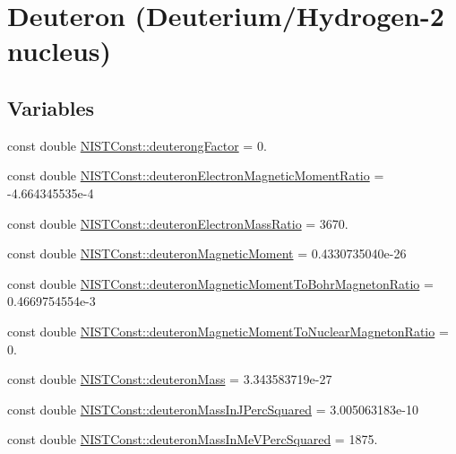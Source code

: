 \hypertarget{group___n_i_s_t_const-_deuteron}{}\section{Deuteron (Deuterium/\+Hydrogen-\/2 nucleus)}
\label{group___n_i_s_t_const-_deuteron}
\subsection*{Variables}
\begin{DoxyCompactItemize}
\item 
const double \hyperlink{group___n_i_s_t_const-_deuteron_ga975b6e46b7ceaa0780c4b066a52444b7}{N\+I\+S\+T\+Const\+::deuterong\+Factor} = 0.
\item 
const double \hyperlink{group___n_i_s_t_const-_deuteron_gaa01fffefa3ab64430fabf08808572689}{N\+I\+S\+T\+Const\+::deuteron\+Electron\+Magnetic\+Moment\+Ratio} = -\/4.\+664345535e-\/4
\item 
const double \hyperlink{group___n_i_s_t_const-_deuteron_gaf25b1cce3ab8e1ec7f4f7790ea06ad0b}{N\+I\+S\+T\+Const\+::deuteron\+Electron\+Mass\+Ratio} = 3670.
\item 
const double \hyperlink{group___n_i_s_t_const-_deuteron_gac8f7404645a2f994d9b1eda283e441d5}{N\+I\+S\+T\+Const\+::deuteron\+Magnetic\+Moment} = 0.\+4330735040e-\/26
\item 
const double \hyperlink{group___n_i_s_t_const-_deuteron_ga6eb7ee28bf12ef4d2e7acf59d29f6450}{N\+I\+S\+T\+Const\+::deuteron\+Magnetic\+Moment\+To\+Bohr\+Magneton\+Ratio} = 0.\+4669754554e-\/3
\item 
const double \hyperlink{group___n_i_s_t_const-_deuteron_ga686e76e6696a7312486f6e39e4583d0b}{N\+I\+S\+T\+Const\+::deuteron\+Magnetic\+Moment\+To\+Nuclear\+Magneton\+Ratio} = 0.
\item 
const double \hyperlink{group___n_i_s_t_const-_deuteron_ga6795eea7d04fa12d83ce437e2e07e2a8}{N\+I\+S\+T\+Const\+::deuteron\+Mass} = 3.\+343583719e-\/27
\item 
const double \hyperlink{group___n_i_s_t_const-_deuteron_ga6b5a049d972613d8d885f53880399100}{N\+I\+S\+T\+Const\+::deuteron\+Mass\+In\+J\+Perc\+Squared} = 3.\+005063183e-\/10
\item 
const double \hyperlink{group___n_i_s_t_const-_deuteron_ga995aff603756394740d5eacd29265d20}{N\+I\+S\+T\+Const\+::deuteron\+Mass\+In\+Me\+V\+Perc\+Squared} = 1875.

\end{DoxyCompactItemize}
